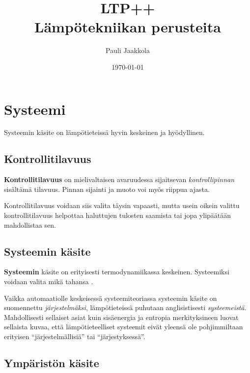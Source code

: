 \documentclass[12pt,a4paper,finnish]{book}
\title{LTP++\\Lämpötekniikan perusteita}
\date{\today}
\author{Pauli Jaakkola}
\begin{document}
\maketitle
\newpage
{}
\setcounter{tocdepth}{3}
\tableofcontents
\newpage
{}
\setcounter{secnumdepth}{3}

% 
\chapter{Systeemi} %

Systeemin käsite on lämpötieteissä hyvin keskeinen ja hyödyllinen.

\section{Kontrollitilavuus} \label{section:kontrollitilavuus}

\textbf{Kontrollitilavuus} on mielivaltaisen avaruudessa sijaitsevan \textit{kontrollipinnan} sisältämä tilavuus. 
Pinnan sijainti ja muoto voi myös riippua ajasta. 

Kontrollitilavuus voidaan siis valita täysin vapaasti, 
mutta usein oikein valittu kontrollitilavuus helpottaa haluttujen tulosten saamista tai jopa ylipäätään mahdollistaa sen.

\section{Systeemin käsite}

\textbf{Systeemin} käsite on erityisesti termodynamiikassa keskeinen. Systeemiksi voidaan valita mikä tahansa 
.

Vaikka automaatiolle keskeisessä systeemiteoriassa systeemin käsite on suomennettu \textit{järjestelmäksi},
lämpötieteissä puhutaan anglisistisesti \textit{systeemeistä}. Mahdollisesti sellaiset asiat kuin 
sisäenergia ja entropia merkityksineen luovat sellaista kuvaa, että lämpötieteelliset systeemit eivät 
yleensä ole pohjimmiltaan erityisen ``järjestelmällisiä'' tai ``järjestyksessä''.

\section{Ympäristön käsite}
\end{document}
